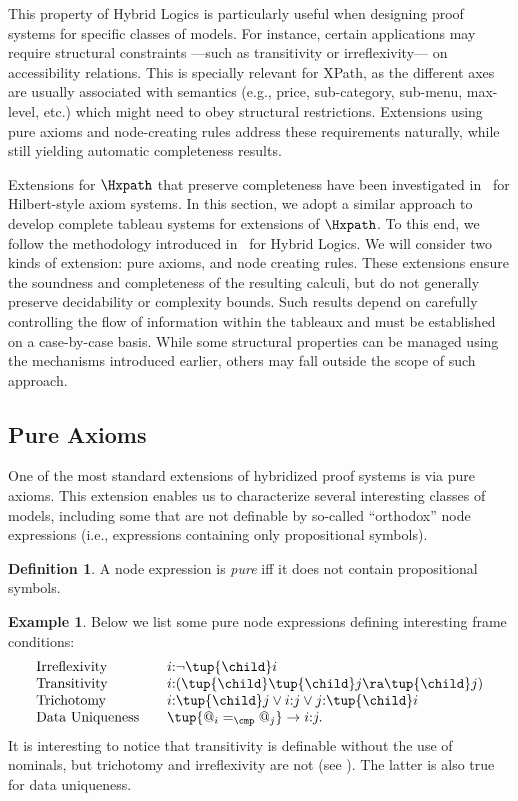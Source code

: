 \documentclass[10pt,a4paper]{amsart}
\theoremstyle{definition}
\newtheorem{defi}[thm]{Definition}
\newtheorem{exa}[thm]{Example}
\theoremstyle{remark}
\begin{document}
This property of Hybrid Logics is particularly useful when designing proof systems for specific classes of models. For instance, certain applications may require structural constraints ---such as transitivity or irreflexivity--- on accessibility relations.
This is specially relevant for XPath, as the different axes are usually associated with semantics (e.g., price, sub-category, sub-menu, max-level, etc.) which might need to obey structural restrictions. 
Extensions using pure axioms and node-creating rules address these requirements naturally, while still yielding automatic completeness results.

Extensions for $\Hxpath$ that preserve completeness have been investigated in~\cite{ArecesF21} for Hilbert-style axiom systems. In this section, we adopt a similar approach to develop complete tableau systems for extensions of $\Hxpath$. To this end, we follow the methodology introduced in~\cite{Blackburn00,Blackburn2002BeyondPA,BtC06} for Hybrid Logics. We will consider two kinds of extension: pure axioms, and node creating rules.  These extensions ensure the soundness and completeness of the resulting calculi, but do not generally preserve decidability or complexity bounds. Such results depend on carefully controlling the flow of information within the tableaux and must be established on a case-by-case basis. While some structural properties can be managed using the mechanisms introduced earlier, others may fall outside the scope of such approach.

\subsection{Pure Axioms} 
One of the most standard extensions of hybridized proof systems is via pure axioms. This extension enables us to characterize several interesting classes of models, including some that are not definable by so-called ``orthodox'' node expressions (i.e., expressions containing only propositional symbols). 

\begin{defi}\label{def:pure}
    A node expression is \emph{pure} iff it does not contain propositional symbols.
\end{defi}

\begin{exa}\label{ex:pure}
 Below we list some pure node expressions defining interesting frame conditions:
 \[
 \begin{array}{l@{\quad\quad}l}
    \text{Irreflexivity}  &  i{:}\neg \tup{\child} i \\
    \text{Transitivity} &  i{:}(\tup{\child}\tup{\child}j \ra \tup{\child}j) \\
    \text{Trichotomy} & i{:}\tup{\child} j \lor i{:}j \lor j{:}\tup{\child}i\\
    \text{Data Uniqueness} & \tup{@_i =_\cmp @_j} \to i{:} j .
 \end{array}
 \]
 It is interesting to notice that transitivity is definable without the use of nominals,  but trichotomy and irreflexivity are not (see \cite{Blackburn00}). The latter is also true for data uniqueness.
\end{exa}
\end{document}
